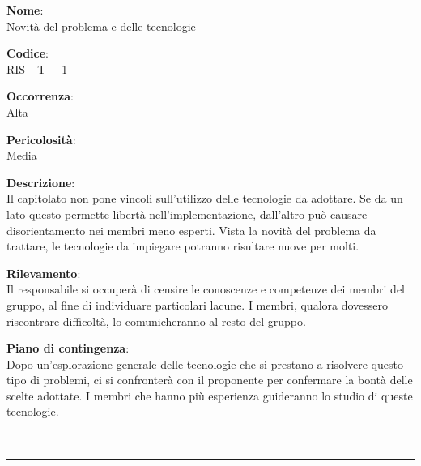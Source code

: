 {\setlength{\parindent}{0cm}
\begin{minipage}{\textwidth} 
\begin{multicols}{4}
\textbf{Nome}: \\ Novità del problema e delle tecnologie \columnbreak

\textbf{Codice}: \\ RIS\_ T \_ 1 
\columnbreak

\textbf{Occorrenza}: \\ Alta 
\columnbreak

\textbf{Pericolosità}: \\ Media

\end{multicols}

\begin{multicols}{3}

\textbf{Descrizione}: \\ Il capitolato non pone vincoli sull'utilizzo delle tecnologie da adottare. Se da un lato questo permette libertà nell'implementazione, dall'altro può causare disorientamento nei membri meno esperti. Vista la novità del problema da trattare, le tecnologie da impiegare potranno risultare nuove per molti.
\columnbreak

\textbf{Rilevamento}: \\ Il responsabile si occuperà di censire le conoscenze e competenze dei membri del gruppo, al fine di individuare particolari lacune. I membri, qualora dovessero riscontrare difficoltà, lo comunicheranno al resto del gruppo.  
\columnbreak

\textbf{Piano di contingenza}: \\ Dopo un'esplorazione generale delle tecnologie che si prestano a risolvere questo tipo di problemi, ci si confronterà con il proponente per confermare la bontà delle scelte adottate. I membri che hanno più esperienza guideranno lo studio di queste tecnologie.\\

\columnbreak
\end{multicols}
\end{minipage}} \\

\noindent\rule{\textwidth}{1pt}\\

